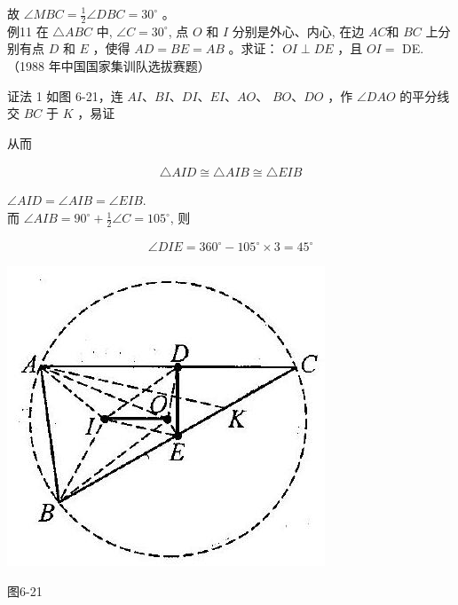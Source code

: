 \documentclass[10pt]{article}
\begin{document}
故 $\angle M B C=\frac{1}{2} \angle D B C=30^{\circ}$ 。\\
例11 在 $\triangle A B C$ 中, $\angle C=30^{\circ}$, 点 $O$ 和 $I$ 分别是外心、内心, 在边 $A C$和 $B C$ 上分别有点 $D$ 和 $E$ ，使得 $A D=B E=A B$ 。求证： $O I \perp D E$ ，且 $O I=$ DE.（1988 年中国国家集训队选拔赛题）

证法 1 如图 6-21，连 $A I 、 B I 、 D I 、 E I 、 A O 、$ $B O 、 D O$ ，作 $\angle D A O$ 的平分线交 $B C$ 于 $K$ ，易证

从而

\begin{align*}
\triangle A I D \cong \triangle A I B \cong \triangle E I B
\end{align*}

$\angle A I D=\angle A I B=\angle E I B$.\\
而 $\angle A I B=90^{\circ}+\frac{1}{2} \angle C=105^{\circ}$, 则

\begin{align*}
\angle D I E=360^{\circ}-105^{\circ} \times 3=45^{\circ}
\end{align*}

\begin{center}
\includegraphics[max width=\textwidth]{2024_10_30_2c8f45efd4a519b08e1ag-071}
\end{center}

图6-21
\end{document}
